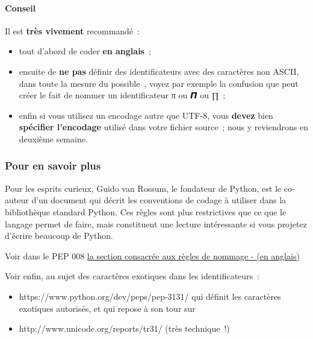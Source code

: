     \hypertarget{conseil}{%
\paragraph{Conseil}\label{conseil}}

Il est \textbf{très vivement} recommandé~:

\begin{itemize}
\tightlist
\item
  tout d'abord de coder \textbf{en anglais}~;
\item
  ensuite de \textbf{ne pas} définir des identificateurs avec des
  caractères non ASCII, dans toute la mesure du possible~, voyez par
  exemple la confusion que peut créer le fait de nommer un
  identificateur π ou 𝞟 ou ∏~;
\item
  enfin si vous utilisez un encodage autre que UTF-8, vous
  \textbf{devez} bien \textbf{spécifier l'encodage} utilisé dans votre
  fichier source~; nous y reviendrons en deuxième semaine.
\end{itemize}

    \hypertarget{pour-en-savoir-plus}{%
\subsubsection{Pour en savoir plus}\label{pour-en-savoir-plus}}

    Pour les esprits curieux, Guido van Rossum, le fondateur de Python, est
le co-auteur d'un document qui décrit les conventions de codage à
utiliser dans la bibliothèque standard Python. Ces règles sont plus
restrictives que ce que le langage permet de faire, mais constituent une
lecture intéressante si vous projetez d'écrire beaucoup de Python.

Voir dans le PEP 008
\href{http://legacy.python.org/dev/peps/pep-0008/\#descriptive-naming-styles}{la
section consacrée aux règles de nommage - (en anglais)}

    Voir enfin, au sujet des caractères exotiques dans les identificateurs~:

\begin{itemize}
\tightlist
\item
  https://www.python.org/dev/peps/pep-3131/ qui définit les caractères
  exotiques autorisés, et qui repose à son tour sur
\item
  http://www.unicode.org/reports/tr31/ (très technique~!)
\end{itemize}


    
    
    
